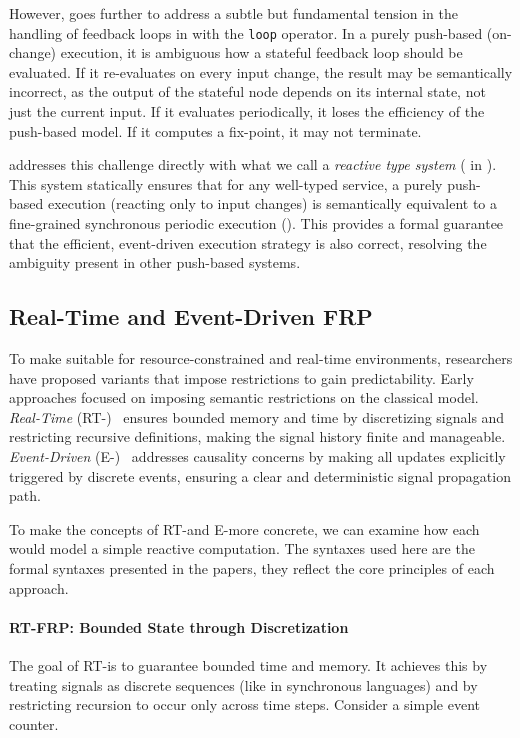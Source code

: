 However, \GRust goes further to address a subtle but fundamental tension in the handling of feedback
loops in \Yampa with the \texttt{loop} operator. In a purely push-based (on-change)
execution, it is ambiguous how a stateful feedback loop should be evaluated. If it re-evaluates on
every input change, the result may be semantically incorrect, as the output of the stateful node
depends on its internal state, not just the current input. If it evaluates periodically, it loses
the efficiency of the push-based model. If it computes a fix-point, it may not terminate.

\GRust addresses this challenge directly with what we call a \emph{reactive type system}
( in ). This
system statically ensures that for any well-typed service, a purely push-based execution (reacting
only to input changes) is semantically equivalent to a fine-grained synchronous periodic execution
(). This provides a formal guarantee that the
efficient, event-driven execution strategy is also correct, resolving the ambiguity present in other
push-based systems.

\subsection{Real-Time and Event-Driven FRP}
\label{sec:sota:frp:rt}

To make \frp suitable for resource-constrained and real-time environments, researchers have proposed
variants that impose restrictions to gain predictability. Early approaches focused on imposing
semantic restrictions on the classical model. \emph{Real-Time \frp}
(RT-\frp)~\cite{DBLP:conf/icfp/WanTH01} ensures bounded memory and time by discretizing signals and
restricting recursive definitions, making the signal history finite and manageable.
\emph{Event-Driven \frp} (E-\frp)~\cite{DBLP:conf/padl/WanTH02} addresses causality concerns by
making all updates explicitly triggered by discrete events, ensuring a clear and deterministic
signal propagation path.

To make the concepts of RT-\frp and E-\frp more concrete, we can examine how each would model a
simple reactive computation. The syntaxes used here are the formal syntaxes presented in the papers,
they reflect the core principles of each approach.

\paragraph*{RT-FRP: Bounded State through Discretization}
The goal of RT-\frp is to guarantee bounded time and memory. It achieves this by treating
signals as discrete sequences (like in synchronous languages) and by restricting recursion to
occur only across time steps. Consider a simple event counter.

